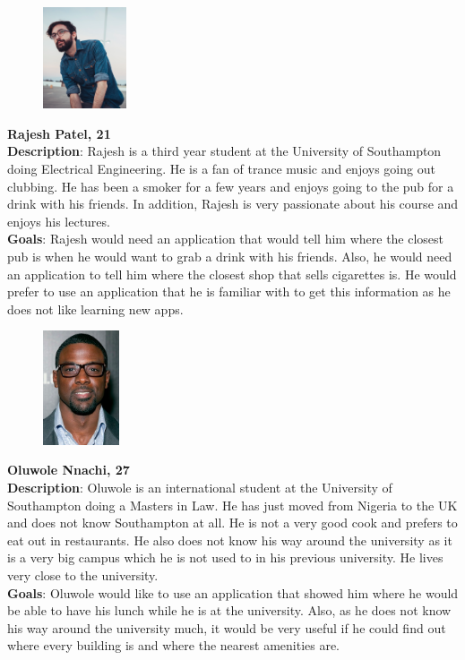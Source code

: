 \documentclass[journal, a4paper]{IEEEtran}
\begin{document}
\begin{figure}[H]
	\centering
    \includegraphics[width=0.22\textwidth]{images/ra_patel}
\end{figure}
\textbf{Rajesh Patel, 21}\\
\textbf{Description}: Rajesh is a third year student at the University of Southampton doing Electrical Engineering. He is a fan of trance music and enjoys going out clubbing. He has been a smoker for a few years and enjoys going to the pub for a drink with his friends. In addition, Rajesh is very passionate about his course and enjoys his lectures.\\ 

\textbf{Goals}: Rajesh would need an application that would tell him where the closest pub is when he would want to grab a drink with his friends. Also, he would need an application to tell him where the closest shop that sells cigarettes is. He would prefer to use an application that he is familiar with to get this information as he does not like learning new apps.\\

\begin{figure}[H]
	\centering
    \includegraphics[width=0.2\textwidth]{images/ol_nnachi}
\end{figure}
\textbf{Oluwole Nnachi, 27}\\
\textbf{Description}: Oluwole is an international student at the University of Southampton doing a Masters in Law. He has just moved from Nigeria to the UK and does not know Southampton at all. He is not a very good cook and prefers to eat out in restaurants. He also does not know his way around the university as it is a very big campus which he is not used to in his previous university. He lives very close to the university.\\ 

\textbf{Goals}: Oluwole would like to use an application that showed him where he would be able to have his lunch while he is at the university. Also, as he does not know his way around the university much, it would be very useful if he could find out where every building is and where the nearest amenities are. 
\end{document}
